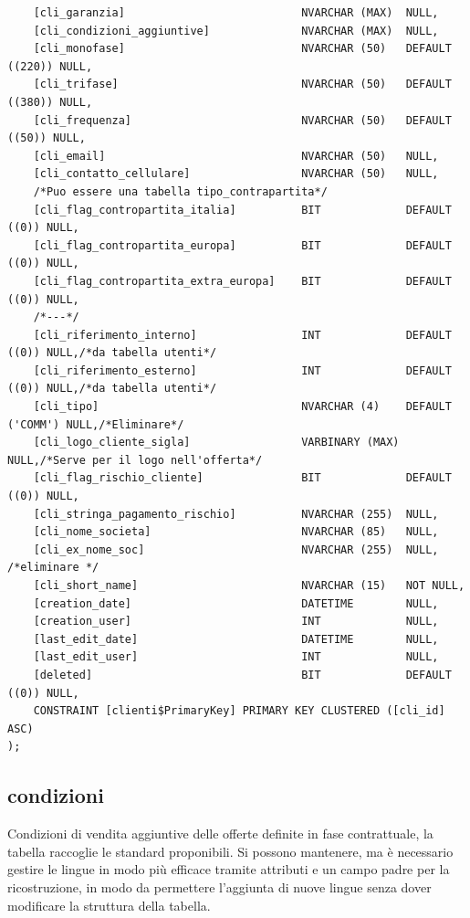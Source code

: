 \documentclass[12pt]{article}
\begin{document}
\begin{lstlisting}
    [cli_garanzia]                           NVARCHAR (MAX)  NULL,
    [cli_condizioni_aggiuntive]              NVARCHAR (MAX)  NULL,
    [cli_monofase]                           NVARCHAR (50)   DEFAULT ((220)) NULL,
    [cli_trifase]                            NVARCHAR (50)   DEFAULT ((380)) NULL,
    [cli_frequenza]                          NVARCHAR (50)   DEFAULT ((50)) NULL,
    [cli_email]                              NVARCHAR (50)   NULL,
    [cli_contatto_cellulare]                 NVARCHAR (50)   NULL,
    /*Puo essere una tabella tipo_contrapartita*/
    [cli_flag_contropartita_italia]          BIT             DEFAULT ((0)) NULL,
    [cli_flag_contropartita_europa]          BIT             DEFAULT ((0)) NULL,
    [cli_flag_contropartita_extra_europa]    BIT             DEFAULT ((0)) NULL,
    /*---*/
    [cli_riferimento_interno]                INT             DEFAULT ((0)) NULL,/*da tabella utenti*/
    [cli_riferimento_esterno]                INT             DEFAULT ((0)) NULL,/*da tabella utenti*/
    [cli_tipo]                               NVARCHAR (4)    DEFAULT ('COMM') NULL,/*Eliminare*/
    [cli_logo_cliente_sigla]                 VARBINARY (MAX) NULL,/*Serve per il logo nell'offerta*/
    [cli_flag_rischio_cliente]               BIT             DEFAULT ((0)) NULL,
    [cli_stringa_pagamento_rischio]          NVARCHAR (255)  NULL,
    [cli_nome_societa]                       NVARCHAR (85)   NULL,
    [cli_ex_nome_soc]                        NVARCHAR (255)  NULL, /*eliminare */
    [cli_short_name]                         NVARCHAR (15)   NOT NULL,
    [creation_date]                          DATETIME        NULL,
    [creation_user]                          INT             NULL,
    [last_edit_date]                         DATETIME        NULL,
    [last_edit_user]                         INT             NULL,
    [deleted]                                BIT             DEFAULT ((0)) NULL,
    CONSTRAINT [clienti$PrimaryKey] PRIMARY KEY CLUSTERED ([cli_id] ASC)
);
\end{lstlisting}

\subsection{condizioni}
Condizioni di vendita aggiuntive delle offerte definite in fase contrattuale, la tabella raccoglie le standard proponibili.
Si possono mantenere, ma è necessario gestire le lingue in modo più efficace tramite attributi
e un campo padre per la ricostruzione, in modo da permettere
l'aggiunta di nuove lingue senza dover modificare la struttura della tabella.
\end{document}
